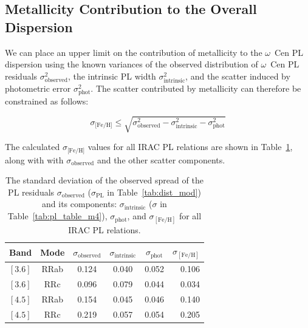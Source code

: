 \documentclass[a4paper,fleqn,usenatbib]{mnras}
\begin{document}
\subsection{Metallicity Contribution to the Overall Dispersion}
\label{sec:dispersions}

We can place an upper limit on the contribution of metallicity to the $\omega$~Cen PL dispersion using the known variances of the observed distribution of $\omega$~Cen PL residuals $\sigma_{\text{observed}}^2$, the intrinsic PL width $\sigma_{\text{intrinsic}}^2$, and the scatter induced by photometric error $\sigma_{\text{phot}}^2$. The scatter contributed by metallicity can therefore be constrained as follows:

\begin{equation}
\sigma_\text{[Fe/H]} \leq \sqrt{\sigma_{\text{observed}}^2 - \sigma_{\text{intrinsic}}^2 - \sigma_{\text{phot}}^2}
\end{equation}

The calculated $\sigma_\text{[Fe/H]}$ values for all IRAC PL relations are shown in Table~\ref{tab:metallicity_sigma}, along with with $\sigma_{\text{observed}}$ and the other scatter components.

\begin{table}
\centering
\caption{The standard deviation of the observed spread of the PL residuals $\sigma_{\text{observed}}$ ($\sigma_{\text{PL}}$ in Table~\ref{tab:dist_mod}) and its components: $\sigma_{\text{intrinsic}}$ ($\sigma$ in Table~\ref{tab:pl_table_m4}), $\sigma_{\text{phot}}$, and $\sigma_{[\text{Fe/H}]}$ for all IRAC PL relations.}
\label{tab:metallicity_sigma}
\begin{tabular}{lccccr} 
\hline \hline
Band & Mode & $\sigma_{\text{observed}}$ & $\sigma_{\text{intrinsic}}$ & $\sigma_{\text{phot}}$ & $\sigma_{[\text{Fe/H}]}$ \\
\hline
$[3.6]$ & RRab & 0.124 & 0.040 & 0.052 & 0.106 \\
$[3.6]$ & RRc & 0.096 & 0.079 & 0.044 & 0.034 \\
$[4.5]$ & RRab & 0.154 & 0.045 & 0.046 & 0.140 \\
$[4.5]$ & RRc & 0.219 & 0.057 & 0.054 & 0.205 \\
\hline
\end{tabular}
\end{table}

\end{document}
